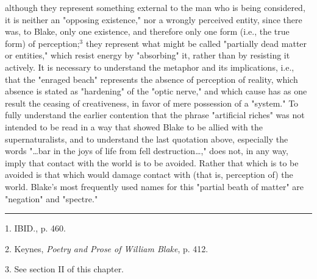 although they represent something external to the man who is being considered, it is neither an
"opposing existence," nor a wrongly perceived entity, since there was, to Blake, only
one existence, and therefore only one form (i.e., the true form) of perception;$^{3}$ they
represent what might be called "partially dead matter or entities," which resist energy
by "absorbing" it, rather than by resisting it actively. It is necessary to understand
the metaphor and its implications, i.e., that the "enraged beach" represents the absence of
perception of reality, which absence is stated as "hardening" of the "optic nerve," and
which cause has as one result the ceasing of creativeness, in favor of mere possession of a "system."
To fully understand the earlier contention that the phrase "artificial riches" was not intended
to be read in a way that showed Blake to be allied with the supernaturalists, and to understand
the last quotation above, especially the words "\dots bar in the joys of life from fell destruction\dots,"
does not, in any way, imply that contact with the world is to be avoided. Rather that which is to be
avoided is that which would damage contact with (that is, perception of) the world.
Blake's most frequently used names for this "partial beath of matter" are "negation" and "spectre."\par
\vspace*{\fill}
\noindent\rule{0.25\textwidth}{0.4pt}\par
1. IBID., p. 460.\par
2. Keynes, \textit{Poetry and Prose of William Blake}, p. 412.\par
3. See section II of this chapter.\par

\newpage


